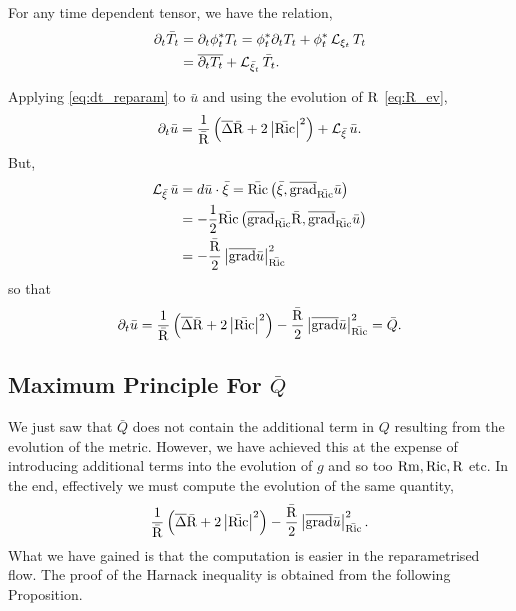 \documentclass{amsart}
\begin{document}
For any time dependent tensor, we have the relation,
\begin{equation}
\label{eq:dt_reparam}
\begin{split}
\partial_t \bar{T}_t &= \partial_t \phi_t^{\ast} T_t = \phi_t^{\ast} \partial_t T_t + \phi_t^{\ast} \operatorname{\mathcal{L}}_{\xi_t} T_t \\
&= \overline{\partial_t T_t} + \operatorname{\mathcal{L}}_{\bar{\xi}_t} \bar{T}_t.
\end{split}
\end{equation}

Applying \eqref{eq:dt_reparam} to \(\bar{u}\) and using the evolution of \(\operatorname{R}\) \eqref{eq:R_ev},
\[
\partial_t \bar{u} = \frac{1}{\bar{\operatorname{R}}} \left(\overline{\operatorname{\Delta}} \bar{\operatorname{R}} + 2\left|{\bar{\operatorname{Ric}}}\right|^2\right) + \operatorname{\mathcal{L}}_{\bar{\xi}} \bar{u}.
\]
But,
\[
\begin{split}
\operatorname{\mathcal{L}}_{\bar{\xi}} \bar{u} &= d\bar{u} \cdot \bar{\xi} = \bar{\operatorname{Ric}} \left(\bar{\xi}, \overline{\operatorname{grad}}_{\bar{\operatorname{Ric}}} \bar{u}\right) \\
&= -\frac{1}{2} \bar{\operatorname{Ric}} \left(\overline{\operatorname{grad}}_{\bar{\operatorname{Ric}}} \bar{\operatorname{R}}, \overline{\operatorname{grad}}_{\bar{\operatorname{Ric}}} \bar{u}\right) \\
&= -\frac{\bar{\operatorname{R}}}{2} \left|{\overline{\operatorname{grad}} \bar{u}}\right|_{\bar{\operatorname{Ric}}}^2
\end{split}
\]
so that
\begin{equation}
\label{eq:dtu_reparm}
\partial_t \bar{u} = \frac{1}{\bar{\operatorname{R}}} \left(\overline{\operatorname{\Delta}} \bar{\operatorname{R}} + 2\left|{\bar{\operatorname{Ric}}}\right|^2\right) - \frac{\bar{\operatorname{R}}}{2} \left|{\overline{\operatorname{grad}} \bar{u}}\right|_{\bar{\operatorname{Ric}}}^2 = \bar{Q}.
\end{equation}

\subsection{Maximum Principle For \(\bar{Q}\)}
\label{subsec:harnack_Q}

We just saw that \(\bar{Q}\) does not contain the additional term in \(Q\) resulting from the evolution of the metric. However, we have achieved this at the expense of introducing additional terms into the evolution of \(g\) and so too \(\operatorname{Rm}, \operatorname{Ric}, \operatorname{R}\) etc. In the end, effectively we must compute the evolution of the same quantity,
\[
\frac{1}{\bar{\operatorname{R}}} \left(\overline{\operatorname{\Delta}} \bar{\operatorname{R}} + 2\left|{\bar{\operatorname{Ric}}}\right|^2\right) - \frac{\bar{\operatorname{R}}}{2} \left|{\overline{\operatorname{grad}} \bar{u}}\right|_{\bar{\operatorname{Ric}}}^2.
\]
What we have gained is that the computation is easier in the reparametrised flow. The proof of the Harnack inequality is obtained from the following Proposition.
\end{document}
